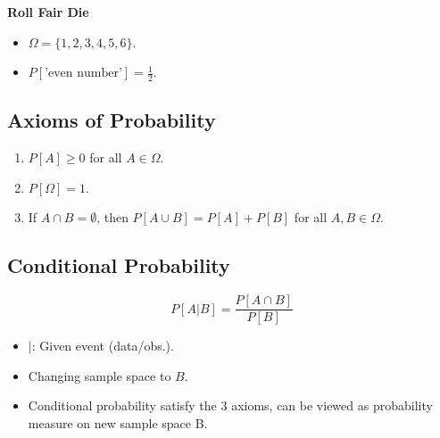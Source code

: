 \begin{example} \textbf{Roll Fair Die}
    \begin{itemize}
        \item $\Omega = \{1, 2, 3, 4, 5, 6\}$.
        \item $P[\text{'even number'}] = \frac{1}{2}$.
    \end{itemize}
\end{example}

\subsection{Axioms of Probability}
\begin{definition}
    \begin{enumerate}
        \item $P[A] \geq 0$ for all $A \in \Omega$.
        \item $P[\Omega] = 1$.
        \item If $A \cap B = \emptyset$, then $P[A \cup B] = P[A] + P[B]$ for all $A, B \in \Omega$.
    \end{enumerate}
\end{definition}

\subsection{Conditional Probability}
\begin{definition}
    \begin{equation}
        P[A|B] = \frac{P[A \cap B]}{P[B]}
    \end{equation}
    \begin{itemize}
        \item $|$: Given event (data/obs.).
    \end{itemize}
\end{definition}

\begin{notes}
    \begin{itemize}
        \item Changing sample space to $B$.
        \item Conditional probability satisfy the 3 axioms, can be viewed as probability measure on new sample space B.
    \end{itemize}
\end{notes}

